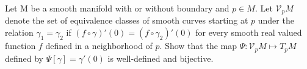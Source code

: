 Let M be a smooth manifold with or without boundary and $p \in M$.  Let $\mathcal{V}_p M$ denote the set of equivalence classes of smooth curves starting at $p$ under the relation $\gamma_1 = \gamma_2$ if $(f \circ \gamma)'(0) = (f \circ \gamma_2)'(0)$ for every smooth real valued function $f$ defined in a neighborhood of $p$. Show that the map $\Psi:\mathcal{V}_pM \mapsto T_pM$ defined by $\Psi[\gamma] = \gamma'(0)$ is well-defined and bijective.